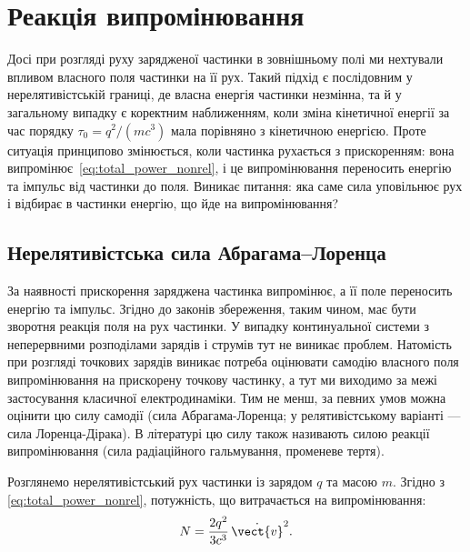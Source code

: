 

\chapter{Реакція випромінювання}\label{\currfilebase}

Досі при розгляді руху зарядженої частинки в зовнішньому полі ми нехтували впливом власного поля частинки на її рух. Такий підхід є послідовним у нерелятивістській границі, де власна енергія частинки незмінна, та й у загальному випадку є коректним наближенням, коли зміна кінетичної енергії за час порядку $\tau_0 = q^2/(mc^3)$ мала порівняно з кінетичною енергією. Проте ситуація принципово змінюється, коли частинка рухається з прискоренням: вона випромінює~\eqref{eq:total_power_nonrel}, і це випромінювання переносить енергію та імпульс від частинки до поля. Виникає питання: яка саме сила уповільнює рух і відбирає в частинки енергію, що йде на випромінювання?

\section{Нерелятивістська сила Абрагама–Лоренца}

За наявності прискорення заряджена частинка випромінює, а її поле переносить енергію та імпульс. Згідно до законів збереження, таким чином, має бути зворотня реакція поля на рух частинки. У випадку континуальної системи з неперервними розподілами зарядів і струмів тут не виникає проблем. Натомість при розгляді точкових зарядів виникає потреба оцінювати самодію власного поля випромінювання на прискорену точкову частинку, а тут ми виходимо за межі застосування класичної електродинаміки. Тим не менш, за певних умов можна оцінити цю силу самодії (сила Абрагама-Лоренца; у релятивістському варіанті --- сила Лоренца-Дірака). В літературі цю силу також називають силою реакції випромінювання (сила радіаційного гальмування, променеве тертя).

Розглянемо нерелятивістський рух частинки із зарядом $q$ та масою $m$. Згідно з \eqref{eq:total_power_nonrel}, потужність, що витрачається на випромінювання:
\begin{equation}\label{eq:Larmor}
	N = \frac{2q^2}{3c^3}\,\dot{\vect{v}}^2.
\end{equation}

